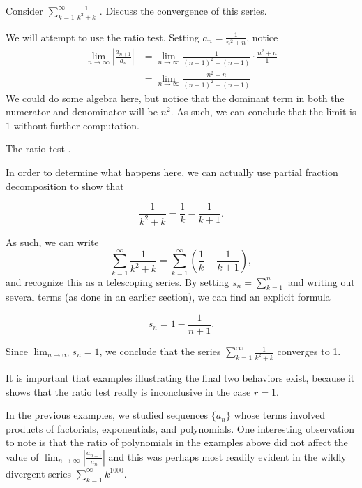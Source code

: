 \documentclass{ximera}
\begin{document}
\begin{example}
  Consider $\sum_{k=1}^\infty \frac{1}{k^2+k}$ .  Discuss the convergence of this series.
  \begin{explanation}
    We will attempt to use the ratio test. Setting $a_n =
    \frac{1}{n^2+n}$, notice 
\begin{align*}
     \lim_{n \to \infty} \left|\frac{a_{n+1}}{a_n}\right| &= \lim_{n \to \infty} \frac{1}{(n+1)^2+(n+1)} \cdot  \frac{n^2+n}{1} \\
     &= \lim_{n \to \infty} \frac{n^2+n}{(n+1)^2+(n+1)}
\end{align*}
We could do some algebra here, but notice that the dominant term in both the numerator and denominator will be $n^2$.  As such, we can conclude that the limit is $1$ without further computation.

The ratio test 
    .		
  
In order to determine what happens here, we can actually use partial fraction decomposition to show that 

\[
\frac{1}{k^2+k} = \frac{1}{k}-\frac{1}{k+1}.
\] 

As such, we can write \[\sum_{k=1}^{\infty} \frac{1}{k^2+k} = \sum_{k=1}^{\infty} \left(\frac{1}{k}-\frac{1}{k+1}\right),\] and recognize this as a telescoping series.  By setting $s_n = \sum_{k=1}^n$ and writing out several terms (as done in an earlier section), we can find an explicit formula

\[
s_n = 1 - \frac{1}{n+1}.
\]

Since $\lim_{n \to \infty} s_n = 1$, we conclude that the series $\sum_{k=1}^{\infty} \frac{1}{k^2+k}$ converges to 1.
\end{explanation}
\end{example}

\begin{remark}
It is important that examples illustrating the final two behaviors
exist, because it shows that the ratio test really is inconclusive in
the case $r=1$.
\end{remark}

In the previous examples, we studied sequences $\{a_n\}$ whose terms involved products of factorials, exponentials, and polynomials.  One interesting observation to note is that the ratio of polynomials in the examples above did not affect the value of $\lim_{n \to \infty} \left|\frac{a_{n+1}}{a_n}\right|$ and this was perhaps most readily evident in the wildly divergent series $\sum_{k=1}^{\infty} k^{1000}$.
\end{document}
